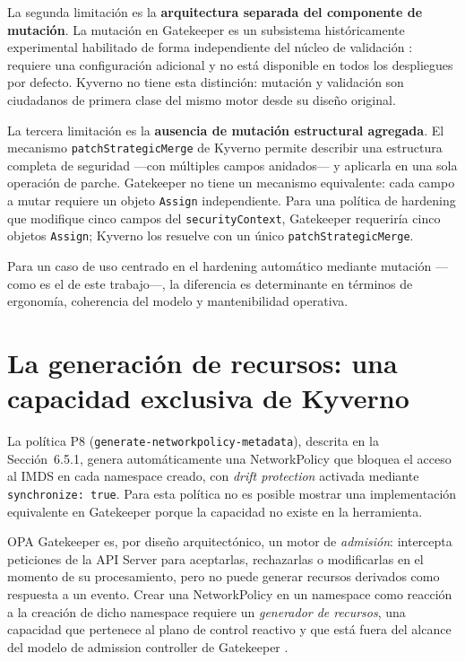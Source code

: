 La segunda limitación es la \textbf{arquitectura separada del componente de mutación}. La mutación en Gatekeeper es un subsistema históricamente experimental habilitado de forma independiente del núcleo de validación \cite{gatekeeper_mutation}: requiere una configuración adicional y no está disponible en todos los despliegues por defecto. Kyverno no tiene esta distinción: mutación y validación son ciudadanos de primera clase del mismo motor desde su diseño original.

La tercera limitación es la \textbf{ausencia de mutación estructural agregada}. El mecanismo \texttt{patchStrategicMerge} de Kyverno permite describir una estructura completa de seguridad ---con múltiples campos anidados--- y aplicarla en una sola operación de parche. Gatekeeper no tiene un mecanismo equivalente: cada campo a mutar requiere un objeto \texttt{Assign} independiente. Para una política de hardening que modifique cinco campos del \texttt{securityContext}, Gatekeeper requeriría cinco objetos \texttt{Assign}; Kyverno los resuelve con un único \texttt{patchStrategicMerge}.

Para un caso de uso centrado en el hardening automático mediante mutación ---como es el de este trabajo---, la diferencia es determinante en términos de ergonomía, coherencia del modelo y mantenibilidad operativa.

\section{La generación de recursos: una capacidad exclusiva de Kyverno}

La política P8 (\texttt{generate-networkpolicy-metadata}), descrita en la Sección~6.5.1, genera automáticamente una NetworkPolicy que bloquea el acceso al IMDS en cada namespace creado, con \textit{drift protection} activada mediante \texttt{synchronize:\,true}. Para esta política no es posible mostrar una implementación equivalente en Gatekeeper porque la capacidad no existe en la herramienta.

OPA Gatekeeper es, por diseño arquitectónico, un motor de \textit{admisión}: intercepta peticiones de la API Server para aceptarlas, rechazarlas o modificarlas en el momento de su procesamiento, pero no puede generar recursos derivados como respuesta a un evento. Crear una NetworkPolicy en un namespace como reacción a la creación de dicho namespace requiere un \textit{generador de recursos}, una capacidad que pertenece al plano de control reactivo y que está fuera del alcance del modelo de admission controller de Gatekeeper \cite{gatekeeper_docs}.

